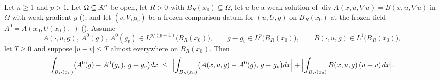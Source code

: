 \begin{lemma}[\textup{(5.4)}: testing both weak forms against $w=u-v$]
Let $n\ge1$ and $p>1$.  Let $\Omega\subseteq\mathbb{R}^n$ be open, let $R>0$ with
$B_R(x_0)\subseteq\Omega$, let $u$ be a weak solution of
$\operatorname{div}A(x,u,\nabla u)=B(x,u,\nabla u)$ in $\Omega$ with weak
gradient $g$ (), and let $(v,V,g_v)$ be a frozen
comparison datum for $(u,U,g)$ on $B_R(x_0)$ at the frozen field
$A^0=A(x_0,U(x_0),\cdot)$ ().  Assume
\[
A(\cdot,u,g),\ A^0(g),\ A^0(g_v)\in L^{p/(p-1)}\bigl(B_R(x_0)\bigr),
\qquad
g-g_v\in L^p\bigl(B_R(x_0)\bigr),
\qquad
B(\cdot,u,g)\in L^1\bigl(B_R(x_0)\bigr),
\]
let $T\ge0$ and suppose $|u-v|\le T$ almost everywhere on $B_R(x_0)$.  Then
\[
\int_{B_R(x_0)}\bigl(A^0(g)-A^0(g_v),\,g-g_v\bigr)dx
\ \le\
\Bigl|\int_{B_R(x_0)}\bigl(A(x,u,g)-A^0(g),\,g-g_v\bigr)dx\Bigr|
+\Bigl|\int_{B_R(x_0)}B(x,u,g)\,(u-v)\,dx\Bigr| .
\]
\end{lemma}
